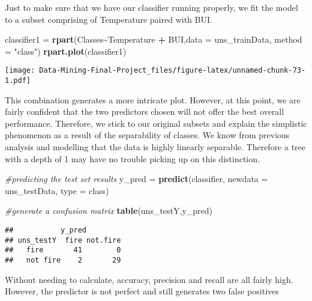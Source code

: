 \documentclass[
]{article}
\newenvironment{Shaded}{\begin{snugshade}}{\end{snugshade}}
\newcommand{\AttributeTok}[1]{\textcolor[rgb]{0.13,0.29,0.53}{#1}}
\newcommand{\CommentTok}[1]{\textcolor[rgb]{0.56,0.35,0.01}{\textit{#1}}}
\newcommand{\FunctionTok}[1]{\textcolor[rgb]{0.13,0.29,0.53}{\textbf{#1}}}
\newcommand{\NormalTok}[1]{#1}
\newcommand{\OtherTok}[1]{\textcolor[rgb]{0.56,0.35,0.01}{#1}}
\newcommand{\SpecialCharTok}[1]{\textcolor[rgb]{0.81,0.36,0.00}{\textbf{#1}}}
\newcommand{\StringTok}[1]{\textcolor[rgb]{0.31,0.60,0.02}{#1}}
\begin{document}
Just to make sure that we have our classifier running properly, we fit
the model to a subset comprising of Temperature paired with BUI.

\begin{Shaded}
\begin{Highlighting}[]
\NormalTok{classifier1 }\OtherTok{=} \FunctionTok{rpart}\NormalTok{(Classes}\SpecialCharTok{\textasciitilde{}}\NormalTok{Temperature }\SpecialCharTok{+}\NormalTok{ BUI,}\AttributeTok{data =}\NormalTok{ uns\_trainData, }\AttributeTok{method =} \StringTok{"class"}\NormalTok{)}
\FunctionTok{rpart.plot}\NormalTok{(classifier1)}
\end{Highlighting}
\end{Shaded}

\texttt{[image: Data-Mining-Final-Project\_files/figure-latex/unnamed-chunk-73-1.pdf]}

This combination generates a more intricate plot. However, at this
point, we are fairly confident that the two predictors chosen will not
offer the best overall performance. Therefore, we stick to our original
subsets and explain the simplistic phenomenon as a result of the
separability of classes. We know from previous analysis and modelling
that the data is highly linearly separable. Therefore a tree with a
depth of 1 may have no trouble picking up on this distinction.

\begin{Shaded}
\begin{Highlighting}[]
\CommentTok{\#predicting the test set results}
\NormalTok{y\_pred }\OtherTok{=} \FunctionTok{predict}\NormalTok{(classifier, }
                 \AttributeTok{newdata =}\NormalTok{ uns\_testData, }
                 \AttributeTok{type =} \StringTok{\textquotesingle{}class\textquotesingle{}}\NormalTok{)}

\CommentTok{\#generate a confusion matrix}
\FunctionTok{table}\NormalTok{(uns\_testY,y\_pred)}
\end{Highlighting}
\end{Shaded}

\begin{verbatim}
##           y_pred
## uns_testY  fire not.fire
##   fire       41        0
##   not fire    2       29
\end{verbatim}

Without needing to calculate, accuracy, precision and recall are all
fairly high. However, the predictor is not perfect and still generates
two false positives
\end{document}
